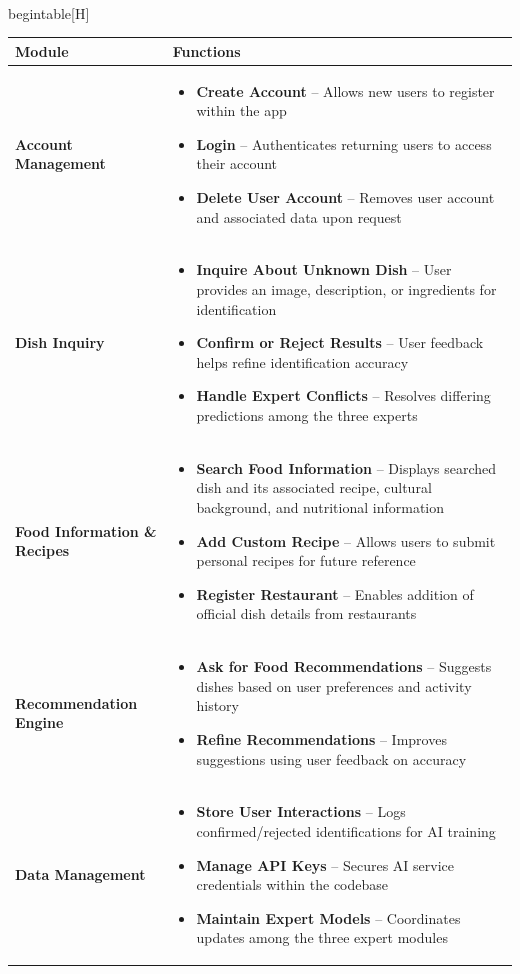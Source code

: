 \documentclass[]{article}
\begin{document}
\\begin{table}[H]
	\centering
	\renewcommand{\arraystretch}{1.2} %
	\begin{tabular}{|p{4cm}|p{10cm}|}
	\hline
	\textbf{Module} & \textbf{Functions} \\
	\hline
	\textbf{Account Management} &
	\begin{itemize}
		\item \textbf{Create Account} – Allows new users to register within the app
		\item \textbf{Login} – Authenticates returning users to access their account
		\item \textbf{Delete User Account} – Removes user account and associated data upon request
	\end{itemize} \\
	\hline
	\textbf{Dish Inquiry} &
	\begin{itemize}
		\item \textbf{Inquire About Unknown Dish} – User provides an image, description, or ingredients for identification
		\item \textbf{Confirm or Reject Results} – User feedback helps refine identification accuracy 
		\item \textbf{Handle Expert Conflicts} – Resolves differing predictions among the three experts
	\end{itemize} \\
	\hline
	\textbf{Food Information \& Recipes} &
	\begin{itemize}
		\item \textbf{Search Food Information} – Displays searched dish and its associated recipe, cultural background, and nutritional information
		\item \textbf{Add Custom Recipe} – Allows users to submit personal
	recipes for future reference
		\item \textbf{Register Restaurant} – Enables addition of official dish details from restaurants
	\end{itemize} \\
	\hline
	\textbf{Recommendation Engine} &
	\begin{itemize}
		\item \textbf{Ask for Food Recommendations} – Suggests dishes based on user preferences and activity history
		\item \textbf{Refine Recommendations} – Improves suggestions using user feedback on accuracy
	\end{itemize} \\
	\hline
	\textbf{Data Management} &
	\begin{itemize}
		\item \textbf{Store User Interactions} – Logs confirmed/rejected identifications for AI training
		\item \textbf{Manage API Keys} – Secures AI service credentials within the codebase
		\item \textbf{Maintain Expert Models} – Coordinates updates among the three expert modules
	\end{itemize} \\
	\hline
	\end{tabular}
\end{document}
